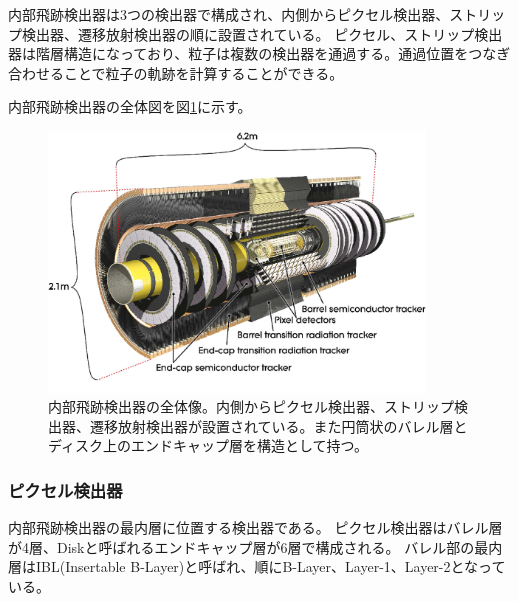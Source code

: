 内部飛跡検出器は3つの検出器で構成され、内側からピクセル検出器、ストリップ検出器、遷移放射検出器の順に設置されている。
ピクセル、ストリップ検出器は階層構造になっており、粒子は複数の検出器を通過する。通過位置をつなぎ合わせることで粒子の軌跡を計算することができる。

内部飛跡検出器の全体図を図\ref{inner_detector}に示す。

\begin{figure}[bpt]\centering
\includegraphics[width=10cm]{inner_detector}
\caption[内部飛跡検出器の全体像]{内部飛跡検出器の全体像\cite{1-2}。内側からピクセル検出器、ストリップ検出器、遷移放射検出器が設置されている。また円筒状のバレル層とディスク上のエンドキャップ層を構造として持つ。}
\label{inner_detector}
\end{figure}


%

\subsubsection{ピクセル検出器}

内部飛跡検出器の最内層に位置する検出器である。
ピクセル検出器はバレル層が4層、Diskと呼ばれるエンドキャップ層が6層で構成される。
バレル部の最内層はIBL(Insertable B-Layer)と呼ばれ、順にB-Layer、Layer-1、Layer-2となっている。

